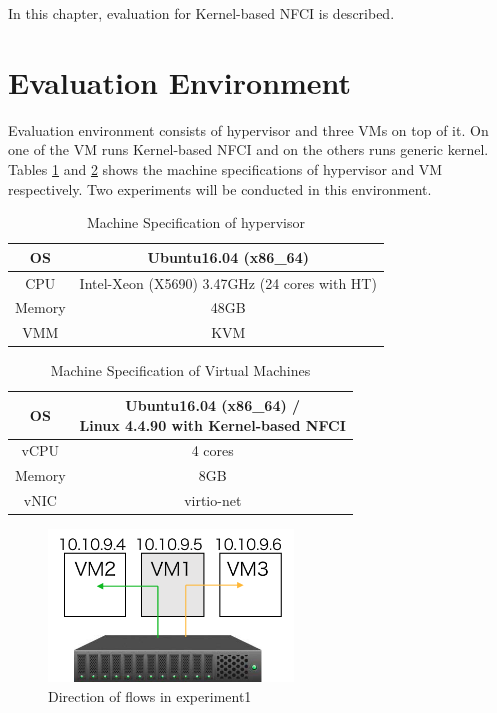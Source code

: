 In this chapter, evaluation for Kernel-based NFCI is described. 
\section{Evaluation Environment}
Evaluation environment consists of hypervisor and three VMs on top of it. On one of the VM runs Kernel-based NFCI and on the others runs generic kernel. Tables \ref{tbl: spec1} and \ref{tbl: spec2} shows the machine specifications of hypervisor and VM respectively. Two experiments will be conducted in this environment.  

\begin{table}
	\centering
	\begin{tabular}{|c||c|}
		\hline
		OS & Ubuntu16.04 (x86\_64) \\
		\hline
		CPU & Intel-Xeon (X5690) 3.47GHz (24 cores with HT) \\
		\hline
		Memory & 48GB \\
		\hline
		VMM & KVM \\
		\hline
	\end{tabular}
	\caption{Machine Specification of hypervisor}
	\label{tbl: spec1}
\end{table}

\begin{table}
	\centering
	\begin{tabular}{|c||c|}
		\hline
		OS &  \shortstack{Ubuntu16.04 (x86\_64) / \\ Linux 4.4.90 with Kernel-based NFCI} \tabularnewline
		\hline
		vCPU & 4 cores \tabularnewline
		\hline
		Memory & 8GB \tabularnewline
		\hline
		vNIC & virtio-net \tabularnewline
		\hline
	\end{tabular}
	\caption{Machine Specification of Virtual Machines} 
	\label{tbl: spec2}
\end{table}

\begin{figure}
	\centering
	\includegraphics[width=65mm]{pics/env1.pdf}
	\caption{Direction of flows in experiment1}
	\label{fig: exp1}
\end{figure}

